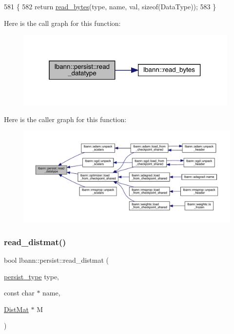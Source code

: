 \begin{DoxyCode}
581                                                                                    \{
582   \textcolor{keywordflow}{return} \hyperlink{classlbann_1_1persist_af24f635f634c8cf30cf53a0e90ec641b}{read\_bytes}(type, name, val, \textcolor{keyword}{sizeof}(DataType));
583 \}
\end{DoxyCode}
Here is the call graph for this function\+:\nopagebreak
\begin{figure}[H]
\begin{center}
\leavevmode
\includegraphics[width=313pt]{classlbann_1_1persist_a1e84eff891affad6001f3c5fa803cae2_cgraph}
\end{center}
\end{figure}
Here is the caller graph for this function\+:\nopagebreak
\begin{figure}[H]
\begin{center}
\leavevmode
\includegraphics[width=350pt]{classlbann_1_1persist_a1e84eff891affad6001f3c5fa803cae2_icgraph}
\end{center}
\end{figure}
\mbox{\label{classlbann_1_1persist_aa98be93f33b510e5b506b61de6bd79bd}} 
\subsubsection{\texorpdfstring{read\+\_\+distmat()}{read\_distmat()}}
{\footnotesize\ttfamily bool lbann\+::persist\+::read\+\_\+distmat (\begin{DoxyParamCaption}\item[{\hyperlink{namespacelbann_adee41f31f15f3906cbdcce4a1417eb56}{persist\+\_\+type}}]{type,  }\item[{const char $\ast$}]{name,  }\item[{\hyperlink{base_8hpp_a0fab5387556805cfeac3e7e567bf66c5}{Dist\+Mat} $\ast$}]{M }\end{DoxyParamCaption})}



